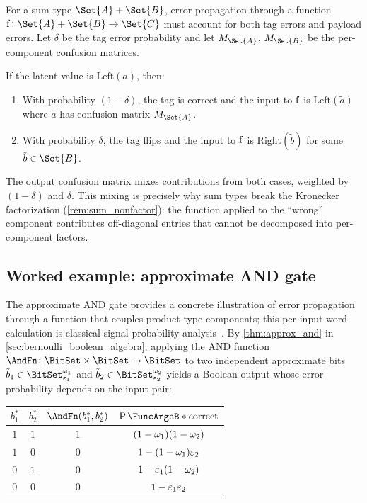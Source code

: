 \documentclass[ ../main.tex]{subfiles}
\begin{document}
For a sum type $\Set{A} + \Set{B}$, error propagation through a function $\Fun{f} \colon \Set{A} + \Set{B} \to \Set{C}$ must account for both tag errors and payload errors.
Let $\delta$ be the tag error probability and let $M_{\Set{A}}$, $M_{\Set{B}}$ be the per-component confusion matrices.

If the latent value is $\mathrm{Left}(a)$, then:
\begin{enumerate}
\item With probability $(1 - \delta)$, the tag is correct and the input to $\Fun{f}$ is $\mathrm{Left}(\tilde{a})$ where $\tilde{a}$ has confusion matrix $M_{\Set{A}}$.
\item With probability $\delta$, the tag flips and the input to $\Fun{f}$ is $\mathrm{Right}(\tilde{b})$ for some $\tilde{b} \in \Set{B}$.
\end{enumerate}
The output confusion matrix mixes contributions from both cases, weighted by $(1 - \delta)$ and $\delta$.
This mixing is precisely why sum types break the Kronecker factorization (\cref{rem:sum_nonfactor}): the function applied to the ``wrong'' component contributes off-diagonal entries that cannot be decomposed into per-component factors.

\subsection{Worked example: approximate AND gate}
\label{sec:approx_and}

The approximate AND gate provides a concrete illustration of error propagation through a function that couples product-type components; this per-input-word calculation is classical signal-probability analysis~\cite{parker1975probabilistic,krishnaswamy2008ptm}.
By \cref{thm:approx_and} in \cref{sec:bernoulli_boolean_algebra}, applying the AND function $\AndFn \colon \BitSet \times \BitSet \to \BitSet$ to two independent approximate bits $\tilde{b}_1 \in \AT{\BitSet}[\fprate_1][\fnrate_1]$ and $\tilde{b}_2 \in \AT{\BitSet}[\fprate_2][\fnrate_2]$ yields a Boolean output whose error probability depends on the input pair:
\begin{center}
\begin{tabular}{@{}cccc@{}}
\toprule
$b_1^*$ & $b_2^*$ & $\AndFn(b_1^*, b_2^*)$ & $\Prob{\text{correct}}$ \\
\midrule
$1$ & $1$ & $1$ & $(1 - \omega_1)(1 - \omega_2)$ \\
$1$ & $0$ & $0$ & $1 - (1 - \omega_1)\varepsilon_2$ \\
$0$ & $1$ & $0$ & $1 - \varepsilon_1(1 - \omega_2)$ \\
$0$ & $0$ & $0$ & $1 - \varepsilon_1 \varepsilon_2$ \\
\bottomrule
\end{tabular}
\end{center}
\end{document}
